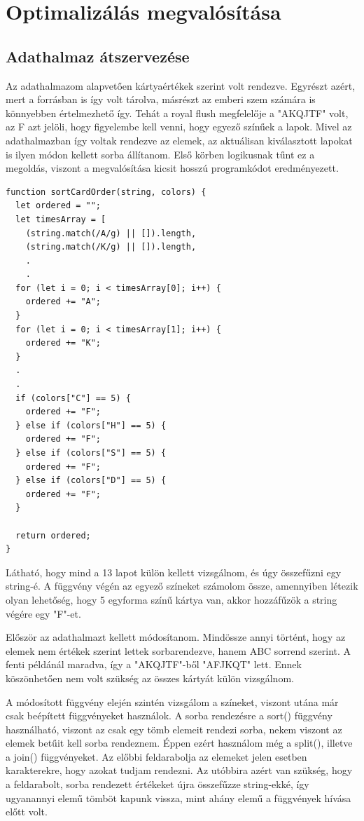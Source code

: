 \section{Optimalizálás megvalósítása}

\subsection{Adathalmaz átszervezése}
Az adathalmazom alapvetően kártyaértékek szerint volt rendezve. Egyrészt azért, mert a forrásban is így volt tárolva, másrészt az emberi szem számára is könnyebben értelmezhető így. Tehát a royal flush megfelelője a "AKQJTF" volt, az F azt jelöli, hogy figyelembe kell venni, hogy egyező színűek a lapok. Mivel az adathalmazban így voltak rendezve az elemek, az aktuálisan kiválasztott lapokat is ilyen módon kellett sorba állítanom. Első körben logikusnak tűnt ez a megoldás, viszont a megvalósítása kicsit hosszú programkódot eredményezett. 

\begin{lstlisting}[style=htmlcssjs]
function sortCardOrder(string, colors) {
  let ordered = "";
  let timesArray = [
    (string.match(/A/g) || []).length,
    (string.match(/K/g) || []).length,
    .
    .
  for (let i = 0; i < timesArray[0]; i++) {
    ordered += "A";
  }
  for (let i = 0; i < timesArray[1]; i++) {
    ordered += "K";
  }
  .
  .
  if (colors["C"] == 5) {
    ordered += "F";
  } else if (colors["H"] == 5) {
    ordered += "F";
  } else if (colors["S"] == 5) {
    ordered += "F";
  } else if (colors["D"] == 5) {
    ordered += "F";
  }

  return ordered;
}
\end{lstlisting}

Látható, hogy mind a 13 lapot külön kellett vizsgálnom, és úgy összefűzni egy string-é. A függvény végén az egyező színeket számolom össze, amennyiben létezik olyan lehetőség, hogy 5 egyforma színű kártya van, akkor hozzáfűzök a string végére egy "F"-et.

Először az adathalmazt kellett módosítanom. Mindössze annyi történt, hogy az elemek nem értékek szerint lettek sorbarendezve, hanem ABC sorrend szerint. A fenti példánál maradva, így a "AKQJTF"-ből "AFJKQT" lett. Ennek köszönhetően nem volt szükség az összes kártyát külön vizsgálnom.

A módosított függvény elején szintén vizsgálom a színeket, viszont utána már csak beépített függvényeket használok. A sorba rendezésre a sort() függvény használható, viszont az csak egy tömb elemeit rendezi sorba, nekem viszont az elemek betűit kell sorba rendeznem. Éppen ezért használom még a split(), illetve a join() függvényeket. Az előbbi feldarabolja az elemeket jelen esetben karakterekre, hogy azokat tudjam rendezni. Az utóbbira azért van szükség, hogy a feldarabolt, sorba rendezett értékeket újra összefűzze string-ekké, így ugyanannyi elemű tömböt kapunk vissza, mint ahány elemű a függvények hívása előtt volt. 

